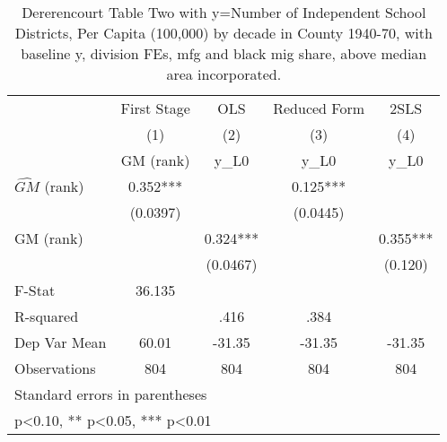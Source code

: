 \begin{table}[htbp]\centering
\def\sym#1{\ifmmode^{#1}\else\(^{#1}\)\fi}
\caption{Dererencourt Table Two with y=Number of Independent School Districts, Per Capita (100,000) by decade in County 1940-70, with baseline y, division FEs, mfg and black mig share, above median area incorporated.}
\begin{tabular}{l*{4}{c}}
\toprule
                    & First Stage   &         OLS   &Reduced Form   &        2SLS   \\
                    &\multicolumn{1}{c}{(1)}&\multicolumn{1}{c}{(2)}&\multicolumn{1}{c}{(3)}&\multicolumn{1}{c}{(4)}\\
                    &\multicolumn{1}{c}{GM  (rank)}&\multicolumn{1}{c}{y\_L0}&\multicolumn{1}{c}{y\_L0}&\multicolumn{1}{c}{y\_L0}\\
\midrule
$\hat{GM}$ (rank)   &       0.352***&               &       0.125***&               \\
                    &    (0.0397)   &               &    (0.0445)   &               \\
\addlinespace
GM  (rank)          &               &       0.324***&               &       0.355***\\
                    &               &    (0.0467)   &               &     (0.120)   \\
\midrule
F-Stat              &      36.135   &               &               &               \\
R-squared           &               &        .416   &        .384   &               \\
Dep Var Mean        &       60.01   &      -31.35   &      -31.35   &      -31.35   \\
Observations        &         804   &         804   &         804   &         804   \\
\bottomrule
\multicolumn{5}{l}{\footnotesize Standard errors in parentheses}\\
\multicolumn{5}{l}{\footnotesize * p<0.10, ** p<0.05, *** p<0.01}\\
\end{tabular}
\end{table}
